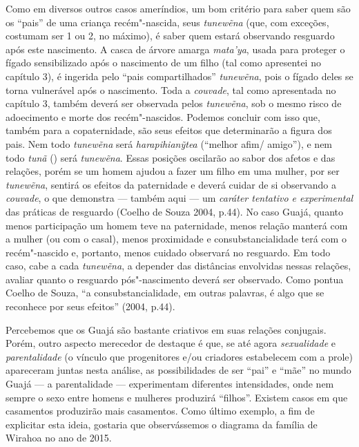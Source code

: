 Como em diversos outros casos ameríndios, um bom critério para saber
quem são os ``pais'' de uma criança recém"-nascida, seus \emph{tunewẽna}
(que, com exceções, costumam ser 1 ou 2, no máximo), é saber quem estará
observando resguardo após este nascimento. A casca de árvore amarga
\emph{mata'ya}, usada para proteger o fígado sensibilizado após o
nascimento de um filho (tal como apresentei no capítulo 3), é ingerida
pelo ``pais compartilhados'' \emph{tunewẽna}, pois o fígado deles se
torna vulnerável após o nascimento. Toda a \emph{couvade}, tal como
apresentada no capítulo 3, também deverá ser observada pelos
\emph{tunewẽna}, sob o mesmo risco de adoecimento e morte dos
recém"-nascidos. Podemos concluir com isso que, também para a
copaternidade, são seus efeitos que determinarão a figura dos pais. Nem
todo \emph{tunewẽna} será \emph{harapihianỹtea} (``melhor afim/
amigo''), e nem todo \emph{tunã} () será \emph{tunewẽna}. Essas
posições oscilarão ao sabor dos afetos e das relações, porém se um homem
ajudou a fazer um filho em uma mulher, por ser \emph{tunewẽna}, sentirá
os efeitos da paternidade e deverá cuidar de si observando a
\emph{couvade}, o que demonstra --- também aqui --- um \emph{caráter
tentativo e experimental} das práticas de resguardo (Coelho de Souza
2004, p.44). No caso Guajá, quanto menos participação um homem teve na
paternidade, menos relação manterá com a mulher (ou com o casal), menos
proximidade e consubstancialidade terá com o recém"-nascido e, portanto,
menos cuidado observará no resguardo. Em todo caso, cabe a cada
\emph{tunewẽna}, a depender das distâncias envolvidas nessas relações,
avaliar quanto o resguardo pós"-nascimento deverá ser observado. Como
pontua Coelho de Souza, ``a consubstancialidade, em outras palavras, é
algo que se reconhece por seus efeitos'' (2004, p.44).

Percebemos que os Guajá são bastante criativos em suas relações
conjugais. Porém, outro aspecto merecedor de destaque é que, se até
agora \emph{sexualidade} e \emph{parentalidade} (o vínculo que
progenitores e/ou criadores estabelecem com a prole) apareceram juntas
nesta análise, as possibilidades de ser ``pai'' e ``mãe'' no mundo Guajá
--- a parentalidade --- experimentam diferentes intensidades, onde nem
sempre o sexo entre homens e mulheres produzirá ``filhos''. Existem
casos em que casamentos produzirão mais casamentos. Como último exemplo,
a fim de explicitar esta ideia, gostaria que observássemos o diagrama da
família de Wirahoa no ano de 2015.

